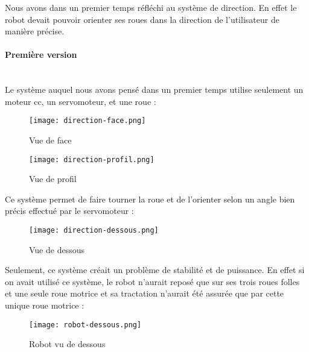 \documentclass[12pt,a4paper]{article}
\begin{document}
\indent \indent Nous avons dans un premier temps réfléchi au système de direction. En effet le robot devait pouvoir orienter ses roues dans la direction de l’utilisateur de manière précise.
	
	\paragraph{Première version}\mbox{}\\

Le système auquel nous avons pensé dans un premier temps utilise seulement un moteur cc, un servomoteur, et une roue :

	\begin{figure}[ht!]
		\centering
			\texttt{[image: direction-face.png]}
			\caption[Vue de face - Illustration réalisée par notre groupe, disponible à l'adresse : \url{https://github.com/thaspdev/PATRICK/illustrations/direction-face.png}]{Vue de face\label{overflow}}
	\end{figure}
	\begin{figure}[ht!]
		\centering
			\texttt{[image: direction-profil.png]}
			\caption[Vue de profil - Illustration réalisée par notre groupe, disponible à l'adresse : \url{https://github.com/thaspdev/PATRICK/illustrations/direction-profil.png}]{Vue de profil\label{overflow}}
	\end{figure}
	
	Ce système permet de faire tourner la roue et de l’orienter selon un angle bien précis effectué par le servomoteur :
	\begin{figure}[ht!]
		\centering
			\texttt{[image: direction-dessous.png]}
			\caption[Vue de dessous - Illustration réalisée par notre groupe, disponible à l'adresse : \url{https://github.com/thaspdev/PATRICK/illustrations/direction-dessous.png}]{Vue de dessous\label{overflow}}
	\end{figure}
	
	Seulement, ce système créait un problème de stabilité et de puissance. En effet si on avait utilisé ce système, le robot n’aurait reposé que sur ses trois roues folles et une seule roue motrice et sa tractation n’aurait été assurée que par cette unique roue motrice :
	
	\begin{figure}[ht!]
		\centering
			\texttt{[image: robot-dessous.png]}
			\caption[Robot vu de dessous - Illustration réalisée par notre groupe, disponible à l'adresse : \url{https://github.com/thaspdev/PATRICK/illustrations/robot-dessous.png}]{Robot vu de dessous\label{overflow}}
	\end{figure}
	
\end{document}
